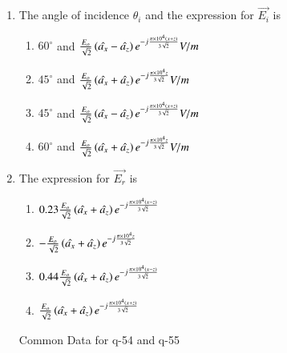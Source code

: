 \documentclass[journal,12pt,onecolumn]{IEEEtran}
\theoremstyle{remark}
\begin{document}
\begin{enumerate}
\item The angle of incidence $\theta_i$ and the expression for $\vec{E_i}$ is 
\begin{enumerate}
    \item $60^{\circ}$ and $\frac{E_o}{\sqrt{2}} \left(\hat{a_x} - \hat{a_z}\right) e^{-j\frac{\pi \times 10^4 \left(x+z\right) }{3\sqrt{2}}} V/m$
    \item $45^{\circ}$ and $\frac{E_o}{\sqrt{2}} \left(\hat{a_x} + \hat{a_z}\right) e^{-j\frac{\pi \times 10^4 z }{3\sqrt{2}}} V/m$
    \item $45^{\circ}$ and $\frac{E_o}{\sqrt{2}} \left(\hat{a_x} - \hat{a_z}\right) e^{-j\frac{\pi \times 10^4 \left(x+z\right) }{3\sqrt{2}}} V/m$
    \item $60^{\circ}$ and $\frac{E_o}{\sqrt{2}} \left(\hat{a_x} + \hat{a_z}\right) e^{-j\frac{\pi \times 10^4 z }{3\sqrt{2}}} V/m$
\end{enumerate}

\item The expression for $\vec{E_r}$ is
\begin{enumerate}
    \item $0.23 \frac{E_o}{\sqrt{2}}  \left( \hat{a_x} + \hat{a_z}\right) e^{-j\frac{\pi \times 10^4 \left(x-z\right) }{3\sqrt{2}}}$
    \item $- \frac{E_o}{\sqrt{2}}  \left( \hat{a_x} + \hat{a_z}\right) e^{-j\frac{\pi \times 10^4 z }{3\sqrt{2}}}$
    \item $0.44 \frac{E_o}{\sqrt{2}}  \left( \hat{a_x} + \hat{a_z}\right) e^{-j\frac{\pi \times 10^4 \left(x-z\right) }{3\sqrt{2}}}$
    \item $ \frac{E_o}{\sqrt{2}}  \left( \hat{a_x} + \hat{a_z}\right) e^{-j\frac{\pi \times 10^4 \left(x+z\right) }{3\sqrt{2}}}$
\end{enumerate}

Common Data for q-54 and q-55


\end{enumerate}
\end{document}

